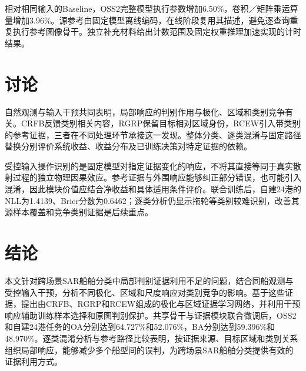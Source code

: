 \documentclass[journal,10pt,a4paper]{IEEEtran}
\begin{document}
相对相同输入的Baseline，OSS2完整模型执行参数增加6.50\%，卷积／矩阵乘运算量增加3.96\%。源参考由固定模型离线编码，在线阶段复用其描述，避免逐查询重复执行参考图像骨干。独立补充材料给出计数范围及固定权重推理加速实现的计时结果。

\section{讨论}\label{ux8ba8ux8bba}

自然观测与输入干预共同表明，局部响应的判别作用与极化、区域和类别竞争有关。CRFB反馈类别相关内容，RGRP保留目标相对区域身份，RCEW引入带类别的参考证据，三者在不同处理环节承接这一发现。整体分类、逐类混淆与固定路径替换分别评价系统收益、收益分布及已训练决策对特定证据的依赖。

受控输入操作识别的是固定模型对指定证据变化的响应，不将其直接等同于真实散射过程的独立物理因果效应。参考证据与外围响应能够纠正部分错误，也可能引入混淆，因此模块价值应结合净收益和具体适用条件评价。联合训练后，自建24港的NLL为1.4139、Brier分数为0.6462；逐类分析仍显示拖轮等类别较难识别，改善其源样本覆盖和竞争类别证据是后续重点。

\section{结论}\label{ux7ed3ux8bba}

本文针对跨场景SAR船舶分类中局部判别证据利用不足的问题，结合同船观测与受控输入干预，分析不同极化、区域和尺度响应对类别竞争的影响。基于这些证据，提出由CRFB、RGRP和RCEW组成的极化与区域证据学习网络，并利用干预响应辅助训练样本选择和原图判别保护。共享骨干与证据模块联合微调后，OSS2和自建24港任务的OA分别达到64.727\%和52.076\%，BA分别达到59.396\%和48.970\%。逐类混淆分析与参考路径比较表明，按证据来源、目标区域和类别关系组织局部响应，能够减少多个船型间的误判，为跨场景SAR船舶分类提供有效的证据利用方式。
\end{document}
